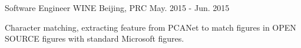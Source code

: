 \begin{cventries}

\cventry
{Software Engineer} %
{WINE} %
{Beijing, PRC} %
{May. 2015 - Jun. 2015} %
{ %
\begin{cvitems}
\item {Character matching, extracting feature from PCANet to match figures in OPEN SOURCE figures with standard Microsoft figures.}
\end{cvitems}
}


\end{cventries}
